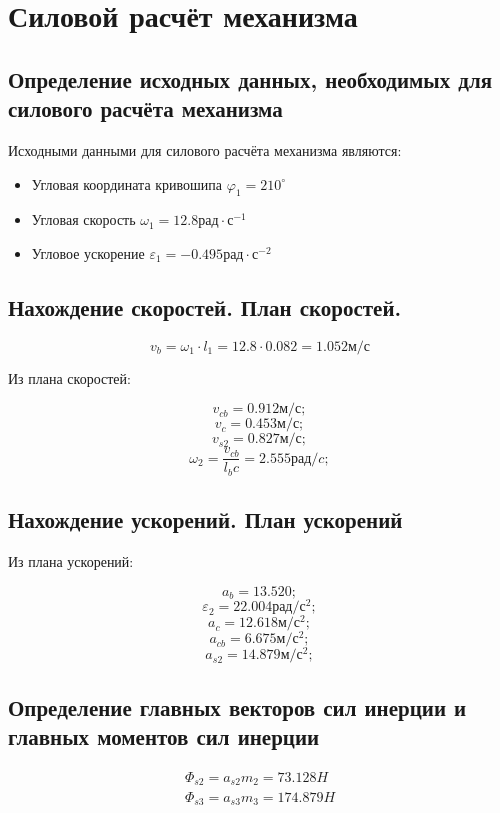 \section{Силовой расчёт механизма}

\subsection{Определение исходных данных, необходимых для силового расчёта механизма}

Исходными данными для силового расчёта механизма являются:

\begin{itemize}
	\item Угловая координата кривошипа $ \varphi_1 = 210^{\circ}$
	\item Угловая скорость $ \omega_1 = 12.8 рад \cdot с^{-1} $
	\item Угловое ускорение $ \varepsilon_1 = -0.495 рад \cdot с^{-2} $
\end{itemize}

\subsection{Нахождение скоростей. План скоростей.}

\begin{equation}
	v_b = \omega_1 \cdot l_1 = 12.8 \cdot 0.082 = 1.052 м/с
\end{equation}

Из плана скоростей:

	$$v_{cb} = 0.912 м/с;$$
	$$v_{c} = 0.453 м/с;$$
	$$v_{s2} = 0.827 м/с;$$
	$$\omega_2 = \dfrac{v_{cb}}{l_bc} = 2.555 рад/c;$$

\subsection{Нахождение ускорений. План ускорений}

Из плана ускорений:

$$a_b = 13.520; $$
$$\varepsilon_2 = 22.004 рад/с^2; $$
$$a_c = 12.618 м/с^2; $$
$$a_{cb} = 6.675 м/с^2; $$
$$a_{s2} = 14.879 м/с^2; $$

\subsection{Определение главных векторов сил инерции и главных моментов сил инерции}

\begin{eqnarray}
	\Phi_{s2} = a_{s2} m_2 = 73.128 H \\
	\Phi_{s3} = a_{s3} m_3 = 174.879 H 
\end{eqnarray}


